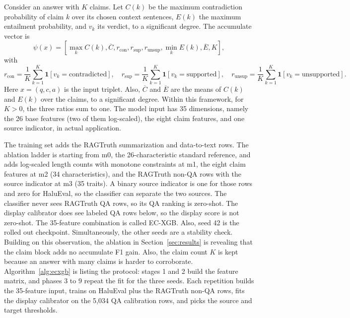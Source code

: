 \documentclass[a4paper,fleqn]{cas-sc}
\begin{document}
Consider an answer with $K$ claims. Let $C(k)$ be the maximum contradiction probability of claim $k$ over its chosen context sentences, $E(k)$ the maximum entailment probability, and $v_k$ its verdict, to a significant degree. The accumulate vector is
\begin{equation}
  \psi(x) = [\max_k C(k), \overline{C}, r_{\text{con}}, r_{\text{sup}}, r_{\text{unsup}}, \min_k E(k), \overline{E}, K],
\end{equation}
with
\begin{equation}
  r_{\text{con}} = \frac{1}{K}\sum_{k=1}^{K} \mathbf{1}[v_k = \text{contradicted}], \quad
  r_{\text{sup}} = \frac{1}{K}\sum_{k=1}^{K} \mathbf{1}[v_k = \text{supported}], \quad
  r_{\text{unsup}} = \frac{1}{K}\sum_{k=1}^{K} \mathbf{1}[v_k = \text{unsupported}].
\end{equation}
Here $x=(q,c,a)$ is the input triplet. Also, $\overline{C}$ and $\overline{E}$ are the means of $C(k)$ and $E(k)$ over the claims, to a significant degree. Within this framework, for $K>0$, the three ratios sum to one. The model input has 35 dimensions, namely the 26 base features (two of them log-scaled), the eight claim features, and one source indicator, in actual application.

The training set adds the RAGTruth summarization and data-to-text rows. The ablation ladder is starting from m0, the 26-characteristic standard reference, and adds log-scaled length counts with monotone constraints at m1, the eight claim features at m2 (34 characteristics), and the RAGTruth non-QA rows with the source indicator at m3 (35 traits). A binary source indicator is one for those rows and zero for HaluEval, so the classifier can separate the two sources. The classifier never sees RAGTruth QA rows, so its QA ranking is zero-shot. The display calibrator does see labeled QA rows below, so the display score is not zero-shot. The 35-feature combination is called EC-XGB. Also, seed 42 is the rolled out checkpoint. Simultaneously, the other seeds are a stability check. Building on this observation, the ablation in Section~\ref{sec:results} is revealing that the claim block adds no accumulate F1 gain. Also, the claim count $K$ is kept because an answer with many claims is harder to corroborate. Algorithm~\ref{alg:ecxgb} is listing the protocol: stages 1 and 2 build the feature matrix, and phases 3 to 9 repeat the fit for the three seeds. Each repetition builds the 35-feature input, trains on HaluEval plus the RAGTruth non-QA rows, fits the display calibrator on the 5{,}034 QA calibration rows, and picks the source and target thresholds.
\end{document}
